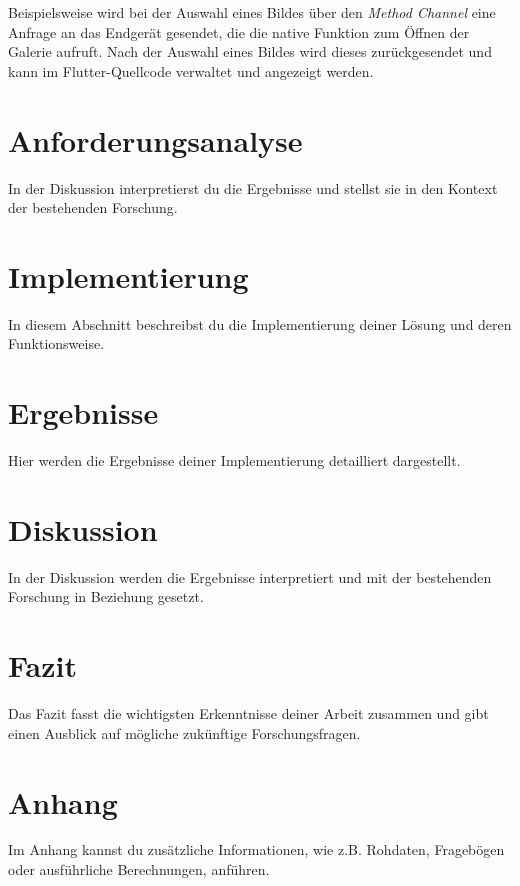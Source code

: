 \documentclass[a4paper,12pt]{article}
\begin{document}
Beispielsweise wird bei der Auswahl eines Bildes über den \textit{Method Channel} eine Anfrage an das Endgerät gesendet, die die native Funktion zum Öffnen der Galerie aufruft. Nach der Auswahl eines Bildes wird dieses zurückgesendet und kann im Flutter-Quellcode verwaltet und angezeigt werden.


\section{Anforderungsanalyse}
In der Diskussion interpretierst du die Ergebnisse und stellst sie in den Kontext der bestehenden Forschung.

\section{Implementierung}
In diesem Abschnitt beschreibst du die Implementierung deiner Lösung und deren Funktionsweise.

\section{Ergebnisse}
Hier werden die Ergebnisse deiner Implementierung detailliert dargestellt.

\section{Diskussion}
In der Diskussion werden die Ergebnisse interpretiert und mit der bestehenden Forschung in Beziehung gesetzt.

\section{Fazit}
Das Fazit fasst die wichtigsten Erkenntnisse deiner Arbeit zusammen und gibt einen Ausblick auf mögliche zukünftige Forschungsfragen.

\newpage

\printbibliography

\appendix
\section{Anhang}
Im Anhang kannst du zusätzliche Informationen, wie z.B. Rohdaten, Fragebögen oder ausführliche Berechnungen, anführen.
\end{document}
